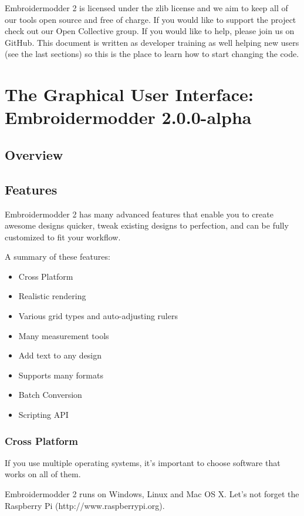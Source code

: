 \documentclass[a4paper]{report}
\begin{document}
Embroidermodder 2 is licensed under the zlib license and we aim to keep all of
our tools open source and free of charge. If you would like to support the
project check out our Open Collective group. If you would like to help, please
join us on GitHub. This document is written as developer training as well
helping new users (see the last sections) so this is the place to learn how
to start changing the code.

\chapter{The Graphical User Interface: Embroidermodder 2.0.0-alpha}

\section{Overview}

\section{Features}

Embroidermodder 2 has many advanced features that enable you to create awesome designs quicker, tweak existing designs to perfection, and can be fully customized to fit your workflow.

A summary of these features:

\begin{itemize}
\item Cross Platform
\item Realistic rendering
\item Various grid types and auto-adjusting rulers
\item Many measurement tools
\item Add text to any design
\item Supports many formats
\item Batch Conversion
\item Scripting API
\end{itemize}

\subsection{Cross Platform}

If you use multiple operating systems, it's important to choose software that works on all of them.

Embroidermodder 2 runs on Windows, Linux and Mac OS X. Let's not forget the Raspberry Pi (http://www.raspberrypi.org).
\end{document}

